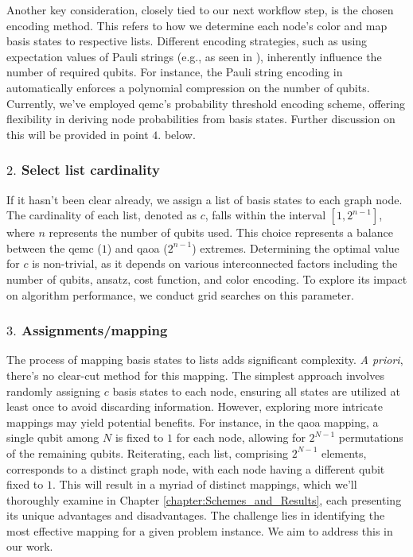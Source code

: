 Another key consideration, closely tied to our next workflow step, is the chosen encoding method. This refers to how we determine each node's color and map basis states to respective lists. Different encoding strategies, such as using expectation values of Pauli strings (e.g., as seen in \cite{sciorilli2024largescale}), inherently influence the number of required qubits. For instance, the Pauli string encoding in \cite{sciorilli2024largescale} automatically enforces a polynomial compression on the number of qubits. Currently, we've employed \acrshort{qemc}'s probability threshold encoding scheme, offering flexibility in deriving node probabilities from basis states. Further discussion on this will be provided in point $4.$ below.

\subsubsection*{$2.$ Select list cardinality}
If it hasn't been clear already, we assign a list of basis states to each graph node. The cardinality of each list, denoted as $c$, falls within the interval $\left[1, 2^{n-1}\right]$, where $n$ represents the number of qubits used. This choice represents a balance between the \acrshort{qemc} ($1$) and \acrshort{qaoa} ($2^{n-1}$) extremes. Determining the optimal value for $c$ is non-trivial, as it depends on various interconnected factors including the number of qubits, ansatz, cost function, and color encoding. To explore its impact on algorithm performance, we conduct grid searches on this parameter.

\subsubsection*{$3.$ Assignments/mapping}
The process of mapping basis states to lists adds significant complexity. \textit{A priori}, there's no clear-cut method for this mapping. The simplest approach involves randomly assigning $c$ basis states to each node, ensuring all states are utilized at least once to avoid discarding information. However, exploring more intricate mappings may yield potential benefits. For instance, in the \acrshort{qaoa} mapping, a single qubit among $N$ is fixed to $1$ for each node, allowing for $2^{N-1}$ permutations of the remaining qubits. Reiterating, each list, comprising $2^{N-1}$ elements, corresponds to a distinct graph node, with each node having a different qubit fixed to $1$. This will result in a myriad of distinct mappings, which we'll thoroughly examine in Chapter \ref{chapter:Schemes_and_Results}, each presenting its unique advantages and disadvantages. The challenge lies in identifying the most effective mapping for a given problem instance. We aim to address this in our work.

